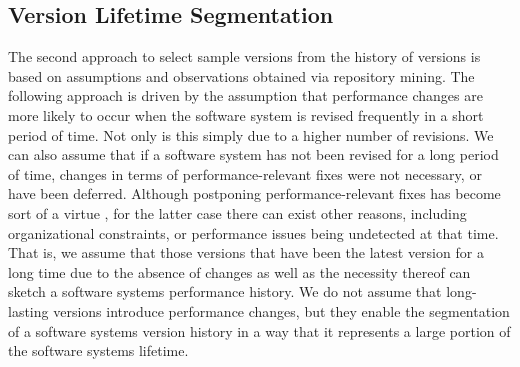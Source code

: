 \subsection{Version Lifetime Segmentation}
The second approach to select sample versions from the history of versions is
based on assumptions and observations obtained via repository mining. The
following approach is driven by the assumption that performance changes are
more likely to occur when the software system is revised frequently in a short
period of time. Not only is this simply due to a higher number of revisions. We
can also assume that if a software system has not been revised for a long
period of time, changes in terms of performance-relevant fixes were not
necessary, or have been deferred. Although postponing performance-relevant
fixes has become sort of a virtue \citep{molyneaux_art_2014}, for the latter
case there can exist other reasons, including organizational constraints, or
performance issues being undetected at that time. That is, we assume that those versions
that have been the latest version for a long time due to the absence of changes
as well as the necessity thereof can sketch a software systems performance
history. We do not assume that long-lasting versions introduce performance
changes, but they enable the segmentation of a software systems version history
in a way that it represents a large portion of the software systems lifetime.

